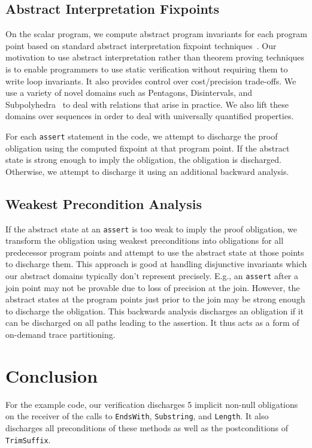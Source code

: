 \documentclass{llncs}
\newcommand{\code}[1]{\lstinline{#1}}
\begin{document}
\subsection{Abstract Interpretation Fixpoints}
On the scalar program, we compute abstract program
invariants for each program point based on standard abstract
interpretation fixpoint techniques~\cite{CousotCousot77}. Our
motivation to use abstract interpretation rather than theorem proving
techniques is to enable programmers to use static verification
without requiring them to write loop invariants. It also provides control
over cost/precision trade-offs. We use a variety of novel domains such
as Pentagons, Disintervals, and Subpolyhedra~\cite{subpolyhedra} to deal with relations
that arise in practice. We also lift these domains over
sequences in order to deal with universally quantified properties.

For each \code{assert} statement in the code, we attempt to discharge
the proof obligation using the computed fixpoint at that program
point. If the abstract state is strong enough to imply the obligation,
the obligation is discharged. Otherwise, we attempt to discharge it
using an additional backward analysis.

\subsection{Weakest Precondition Analysis}
If the abstract state at an \code{assert} is too weak to imply the
proof obligation, we transform the obligation using weakest
preconditions into obligations for all predecessor program points
and attempt to use the abstract state at those points to discharge
them. This approach is good at handling disjunctive invariants which
our abstract domains typically don't represent precisely. E.g., an
\code{assert} after a join point may not be provable due to loss of
precision at the join. However, the abstract states at the program
points just prior to the
join may be strong enough to discharge the obligation. This backwards
analysis discharges an obligation if it can be discharged on all paths
leading to the assertion. 
It thus acts as a form of on-demand trace partitioning. 

\section{Conclusion}
For the example code, our verification discharges 5 implicit non-null
obligations on the receiver of the calls to \code{EndsWith},
\code{Substring}, and \code{Length}. It also discharges all
preconditions of these methods as well as the postconditions of
\code{TrimSuffix}.
\end{document}
